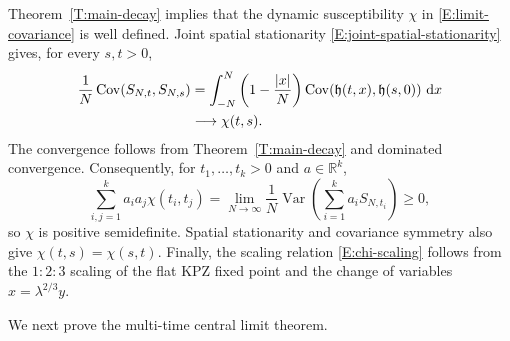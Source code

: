 \documentclass[12pt, reqno]{amsart}
\numberwithin{equation}{section}
\theoremstyle{definition}
\newcommand{\R}{\mathbb{R}}
\newcommand{\h}{\mathfrak{h}}
\newcommand{\Cov}{\operatorname{Cov}}
\newcommand{\Var}{\operatorname{Var}}
\newcommand{\dd}{\,\mathrm{d}}
\begin{document}
Theorem~\ref{T:main-decay} implies that the dynamic susceptibility $\chi$ in
\eqref{E:limit-covariance} is well defined. Joint spatial stationarity
\eqref{E:joint-spatial-stationarity} gives, for every $s,t>0$,
\begin{align}
  \frac1N\Cov(S_{N,t},S_{N,s})
  &=\int_{-N}^{N}\left(1-\frac{|x|}{N}\right)
    \Cov(\h(t,x),\h(s,0))\,\dd x\notag\\
  &\longrightarrow \chi(t,s).
  \label{E:Fejer-covariance}
\end{align}
The convergence follows from Theorem~\ref{T:main-decay} and dominated
convergence. Consequently, for $t_1,\ldots,t_k>0$ and $a\in\R^k$,
\[
  \sum_{i,j=1}^k a_i a_j\chi(t_i,t_j)
  =\lim_{N\to\infty}\frac1N
    \Var\!\left(\sum_{i=1}^k a_iS_{N,t_i}\right)\ge0,
\]
so $\chi$ is positive semidefinite. Spatial stationarity and covariance symmetry
also give $\chi(t,s)=\chi(s,t)$. Finally, the scaling relation
\eqref{E:chi-scaling} follows from the $1:2:3$ scaling of the flat KPZ fixed
point and the change of variables $x=\lambda^{2/3}y$.

We next prove the multi-time central limit theorem.
\end{document}
